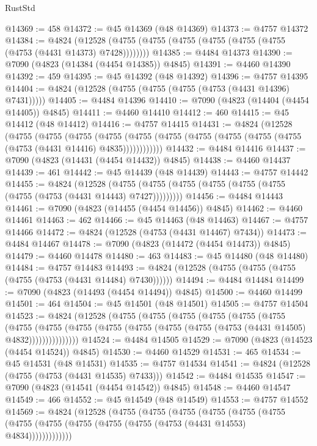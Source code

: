 \begin{lexlean}{RustStd}
\begin{coremodule}
@14369 := 458
@14372 := @45 @14369 (@48 @14369)
@14373 := @4757 @14372
@14384 := @4824
    (@12528 (@4755 (@4755 (@4755 (@4755 (@4755 (@4755 (@4753 (@4431 @14373) @7428))))))))
@14385 := @4484 @14373
@14390 := @7090 (@4823 (@14384 (@4454 @14385)) @4845)
@14391 := @4460 @14390
@14392 := 459
@14395 := @45 @14392 (@48 @14392)
@14396 := @4757 @14395
@14404 := @4824 (@12528 (@4755 (@4755 (@4755 (@4753 (@4431 @14396) @7431)))))
@14405 := @4484 @14396
@14410 := @7090 (@4823 (@14404 (@4454 @14405)) @4845)
@14411 := @4460 @14410
@14412 := 460
@14415 := @45 @14412 (@48 @14412)
@14416 := @4757 @14415
@14431 := @4824
    (@12528
      (@4755
        (@4755
          (@4755
            (@4755 (@4755 (@4755 (@4755 (@4755 (@4755 (@4755 (@4753 (@4431 @14416) @4835))))))))))))
@14432 := @4484 @14416
@14437 := @7090 (@4823 (@14431 (@4454 @14432)) @4845)
@14438 := @4460 @14437
@14439 := 461
@14442 := @45 @14439 (@48 @14439)
@14443 := @4757 @14442
@14455 := @4824
    (@12528 (@4755 (@4755 (@4755 (@4755 (@4755 (@4755 (@4755 (@4753 (@4431 @14443) @7427)))))))))
@14456 := @4484 @14443
@14461 := @7090 (@4823 (@14455 (@4454 @14456)) @4845)
@14462 := @4460 @14461
@14463 := 462
@14466 := @45 @14463 (@48 @14463)
@14467 := @4757 @14466
@14472 := @4824 (@12528 (@4753 (@4431 @14467) @7434))
@14473 := @4484 @14467
@14478 := @7090 (@4823 (@14472 (@4454 @14473)) @4845)
@14479 := @4460 @14478
@14480 := 463
@14483 := @45 @14480 (@48 @14480)
@14484 := @4757 @14483
@14493 := @4824 (@12528 (@4755 (@4755 (@4755 (@4755 (@4753 (@4431 @14484) @7430))))))
@14494 := @4484 @14484
@14499 := @7090 (@4823 (@14493 (@4454 @14494)) @4845)
@14500 := @4460 @14499
@14501 := 464
@14504 := @45 @14501 (@48 @14501)
@14505 := @4757 @14504
@14523 := @4824
    (@12528
      (@4755
        (@4755
          (@4755
            (@4755
              (@4755
                (@4755
                  (@4755
                    (@4755
                      (@4755 (@4755 (@4755 (@4755 (@4755 (@4753 (@4431 @14505) @4832)))))))))))))))
@14524 := @4484 @14505
@14529 := @7090 (@4823 (@14523 (@4454 @14524)) @4845)
@14530 := @4460 @14529
@14531 := 465
@14534 := @45 @14531 (@48 @14531)
@14535 := @4757 @14534
@14541 := @4824 (@12528 (@4755 (@4753 (@4431 @14535) @7433)))
@14542 := @4484 @14535
@14547 := @7090 (@4823 (@14541 (@4454 @14542)) @4845)
@14548 := @4460 @14547
@14549 := 466
@14552 := @45 @14549 (@48 @14549)
@14553 := @4757 @14552
@14569 := @4824
    (@12528
      (@4755
        (@4755
          (@4755
            (@4755
              (@4755
                (@4755 (@4755 (@4755 (@4755 (@4755 (@4755 (@4753 (@4431 @14553) @4834)))))))))))))

\end{coremodule}
\end{lexlean}
